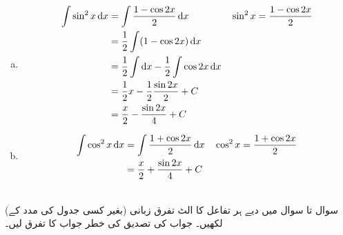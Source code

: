 \begin{enumerate}[a.]
\item
\begin{align*}
\int\sin^2x\dif x&=\int\frac{1-\cos 2x}{2}\dif x&&\sin^2x=\frac{1-\cos 2x}{2}\\
&=\frac{1}{2}\int(1-\cos 2x)\dif x\\
&=\frac{1}{2}\int \dif x-\frac{1}{2}\int \cos 2x\dif x\\
&=\frac{1}{2}x-\frac{1}{2}\frac{\sin 2x}{2}+C\\
&=\frac{x}{2}-\frac{\sin 2x}{4}+C
\end{align*}
\item
\begin{align*}
\int\cos^2x\dif x&=\int\frac{1+\cos 2x}{2}\dif x&&\cos^2x=\frac{1+\cos 2x}{2}\\
&=\frac{x}{2}+\frac{\sin 2x}{4}+C
\end{align*}
\end{enumerate}

\\
سوال  تا سوال  میں دیے  ہر تفاعل کا الٹ تفرق زبانی (بغیر کسی جدول کی مدد کے) لکھیں۔ جواب کی تصدیق کی خطر جواب کا تفرق لیں۔

